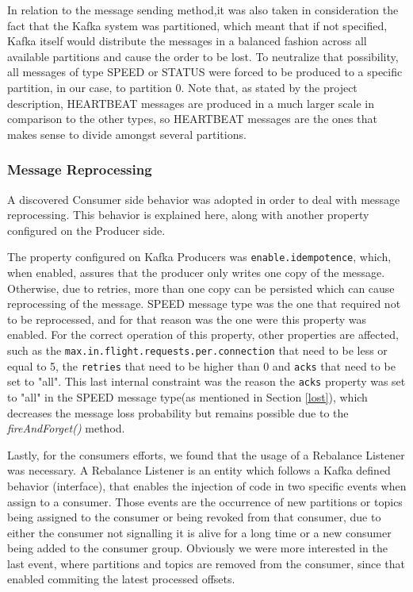 \documentclass[12pt]{article}
\begin{document}
In relation to the message sending method,it was also taken in consideration the fact that the Kafka system was partitioned, which meant that if not specified, 
Kafka itself would distribute the messages in a balanced fashion across all available partitions and cause the order to be lost. 
To neutralize that possibility, all messages of type SPEED or STATUS were forced to be produced to a specific partition, in our case, to partition 0.
Note that, as stated by the project description, HEARTBEAT messages are produced in a much larger scale in comparison to the other types, so HEARTBEAT messages
are the ones that makes sense to divide amongst several partitions.

\subsubsection{Message Reprocessing}\label{reprocessing}

A discovered Consumer side behavior was adopted in order to deal with message reprocessing.
This behavior is explained here, along with another property configured on the Producer side.

The property configured on Kafka Producers was \texttt{enable.idempotence}, which, when enabled, assures that the producer only writes one copy of the message. 
Otherwise, due to retries, more than one copy can be persisted which can cause reprocessing of the message. 
SPEED message type was the one that required not to be reprocessed, and for that reason was the one were this property was enabled. 
For the correct operation of this property, other properties are affected, such as the \texttt{max.in.flight.requests.per.connection} that need to be less or 
equal to 5, the \texttt{retries} that need to be higher than 0 and \texttt{acks} that need to be set to "all". 
This last internal constraint was the reason the \texttt{acks} property was set to "all" in the SPEED message type(as mentioned in Section \ref{lost}), which 
decreases the message loss probability but remains possible due to the \textit{fireAndForget()} method.

Lastly, for the consumers efforts, we found that the usage of a Rebalance Listener was necessary. 
A Rebalance Listener is an entity which follows a Kafka defined behavior (interface), that enables the injection of code in two specific events when assign to a consumer. 
Those events are the occurrence of new partitions or topics being assigned to the consumer or being revoked from that consumer, due to either the consumer not 
signalling it is alive for a long time or a new consumer being added to the consumer group. 
Obviously we were more interested in the last event, where partitions and topics are removed from the consumer, since that enabled commiting the latest processed offsets.
\end{document}
